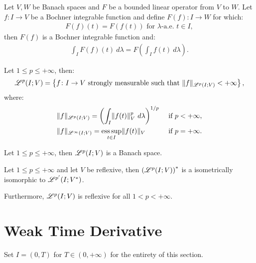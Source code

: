 \begin{corollary}
    Let $V, W$ be Banach spaces and $F$ be a bounded linear operator from $V$ to $W$. Let $f\colon I \rightarrow V$ be a Bochner integrable function and define $F(f) \colon I \rightarrow W$ for which:
    \begin{gather}
        F(f)(t) = F(f(t)) \text{ for } \lambda \text{-a.e. } t \in I,
    \end{gather}
    then $F(f)$ is a Bochner integrable function and:
    \begin{gather}
        \int_I F(f)(t) ~ d \lambda = F\left( \int_I f(t) ~ d \lambda \right).
    \end{gather}
\end{corollary}

\begin{definition}[$\Lp{p}(I; V)$]
    Let $1 \leq p \leq +\infty$, then:
    \begin{gather}
        \mathscr{L}^{p}(I; V) = \left\{ f \colon I \rightarrow V \text{ strongly measurable such that } \lVert f \rVert_{\mathscr{L}^{p}(I; V)} < +\infty \right\},
    \end{gather}
    where:
    \begin{align}
        & \lVert f \rVert_{\mathscr{L}^{p}(I; V)} = \left( \int_I \lVert f(t) \rVert_V^p ~ d \lambda \right)^{1/p} & \text{ if } p < +\infty, \\
        & \lVert f \rVert_{\mathscr{L}^{\infty}(I; V)} = \operatorname*{ess\,sup}_{t \in I} \lVert f(t) \rVert_V & \text{ if } p = +\infty.
    \end{align}
\end{definition}

\begin{theorem}
    Let $1 \leq p \leq +\infty$, then $\Lp{p}(I; V)$ is a Banach space.
\end{theorem}

\begin{theorem}
    Let $1 \leq p \leq +\infty$ and let $V$ be reflexive, then $\left( \mathscr{L}^{p}(I; V) \right)^{*}$ is a isometrically isomorphic to $\mathscr{L}^{p^{\prime}}(I; V^{*})$.

    Furthermore, $\Lp{p}(I; V)$ is reflexive for all $1 < p < +\infty$.
\end{theorem}

\newpage
\section{Weak Time Derivative}

Set $I = (0, T)$ for $T \in (0, +\infty)$ for the entirety of this section.

